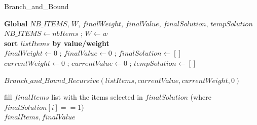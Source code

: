 \documentclass[a4paper, 11pt]{article}
\begin{document}
\listofalgocfs

\newpage
\begin{algorithm}[hbt!]
    \caption{Branch\_and\_Bound}\label{alg:two}
    
    \BlankLine
    \textbf{Global} $NB\_ITEMS$, $W$, $finalWeight$, $finalValue$, $finalSolution$, $tempSolution$\\
    
    \BlankLine
    $NB\_ITEMS \leftarrow nbItems$ ; 
    $W \leftarrow w$\\
    \textbf{sort $listItems$ by value/weight}\\
    $finalWeight \leftarrow 0$ ; 
    $finalValue \leftarrow 0$ ; 
    $finalSolution \leftarrow []$\\
    $currentWeight \leftarrow 0$ ; 
    $currentValue \leftarrow 0$ ; 
    $tempSolution \leftarrow []$\\
    
    \BlankLine
    $Branch\_and\_Bound\_Recursive(listItems,currentValue, currentWeight, 0)$
    
    \BlankLine
    fill $finalItems$ list with the items selected in $finalSolution$ (where $finalSolution[i] == 1$)\\
    \Return $finalItems, finalValue$
    
    
\end{algorithm}
\end{document}
